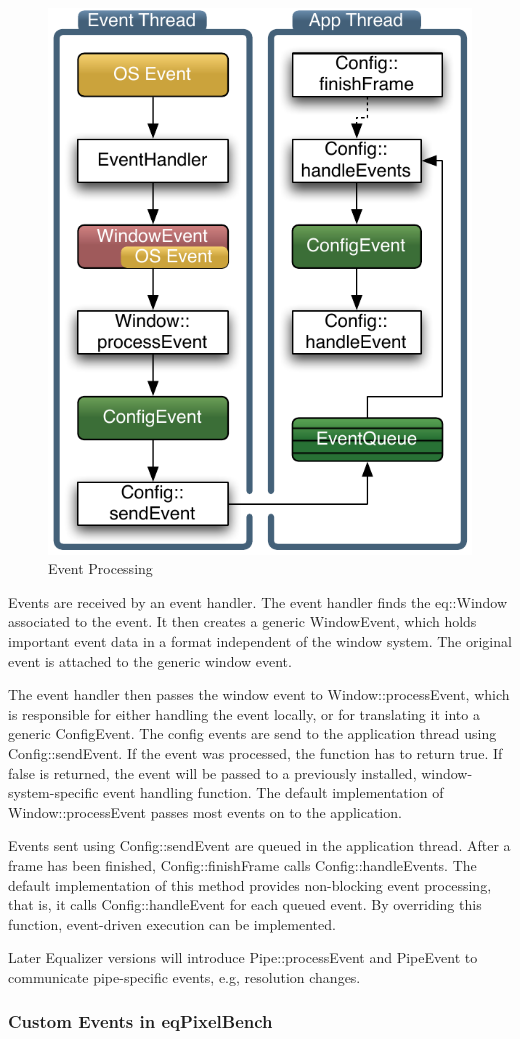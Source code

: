 \documentclass[10pt,a4]{scrartcl}
\begin{document}
\begin{figure}
  \includegraphics[width=.4\textwidth]{images/eventFilter.pdf}
  {\caption{\small\label{fEventProcessing}Event Processing}}
\end{figure}
Events are received by an event handler. The event handler finds the
\textsf{eq::Window} associated to the event. It then creates a generic
\textsf{WindowEvent}, which holds important event data in a format
independent of the window system. The original event is attached to the
generic window event.

The event handler then passes the window event to
\textsf{Window::processEvent}, which is responsible for either handling
the event locally, or for translating it into a generic
\textsf{ConfigEvent}. The config events are send to the application
thread using \textsf{Config::sendEvent}. If the event was processed, the
function has to return \textsf{true}. If \textsf{false} is returned, the
event will be passed to a previously installed, window-system-specific
event handling function. The default implementation of
\textsf{Window::processEvent} passes most events on to the application.

Events sent using \textsf{Config::sendEvent} are queued in the
application thread. After a frame has been finished,
\textsf{Config::finishFrame} calls \textsf{Config::handleEvents}. The
default implementation of this method provides non-blocking event
processing, that is, it calls \textsf{Config::handleEvent} for each
queued event. By overriding this function, event-driven execution can be
implemented.

Later Equalizer versions will introduce \textsf{Pipe::processEvent} and
\textsf{PipeEvent} to communicate pipe-specific events, e.g, resolution
changes.

\subsubsection{Custom Events in eqPixelBench}
\end{document}
